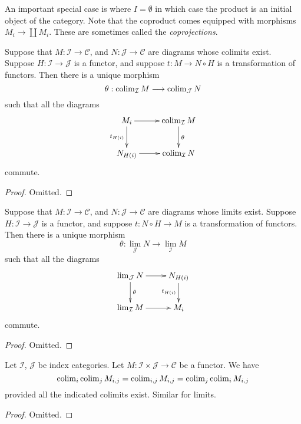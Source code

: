 \noindent
An important special case is where $I = \emptyset$ in which case the
product is an initial object of the category.
Note that the coproduct comes equipped with morphisms
$M_i \to \coprod M_i$. These are sometimes called the
{\it coprojections}.

\begin{lemma}
\label{lemma-functorial-colimit}
Suppose that $M : \mathcal{I} \to \mathcal{C}$,
and $N : \mathcal{J} \to \mathcal{C}$ are diagrams
whose colimits exist. Suppose
$H : \mathcal{I} \to \mathcal{J}$ is
a functor, and suppose $t : M \to N \circ H$
is a transformation of functors.
Then there is a unique morphism
$$
\theta :
\mathop{\rm colim}\nolimits_{\mathcal{I}} M
\longrightarrow
\mathop{\rm colim}\nolimits_{\mathcal{J}} N
$$
such that all the diagrams
$$
\xymatrix{
M_i \ar[d]_{t_{H(i)}} \ar[r]
&
\colim_{\mathcal{I}} M \ar[d]^{\theta}
\\
N_{H(i)} \ar[r]
&
\colim_{\mathcal{I}} N
}
$$
commute.
\end{lemma}

\begin{proof}
Omitted.
\end{proof}

\begin{lemma}
\label{lemma-functorial-limit}
Suppose that $M : \mathcal{I} \to \mathcal{C}$,
and $N : \mathcal{J} \to \mathcal{C}$ are diagrams
whose limits exist. Suppose $H : \mathcal{I} \to \mathcal{J}$ is
a functor, and suppose $t : N \circ H \to M$
is a transformation of functors.
Then there is a unique morphism
$$
\theta :
\lim_{\mathcal{J}} N
\longrightarrow
\lim_{\mathcal{I}} M
$$
such that all the diagrams
$$
\xymatrix{
\lim_{\mathcal{J}} N \ar[d]^{\theta} \ar[r]
&
N_{H(i)} \ar[d]_{t_{H(i)}}
\\
\lim_{\mathcal{I}} M \ar[r]
&
M_i
}
$$
commute.
\end{lemma}

\begin{proof}
Omitted.
\end{proof}


\begin{lemma}
\label{lemma-colimits-commute}
Let $\mathcal{I}$, $\mathcal{J}$ be index categories.
Let $M : \mathcal{I} \times \mathcal{J} \to \mathcal{C}$ be a functor.
We have
$$
\mathop{\rm colim}\nolimits_i \mathop{\rm colim}\nolimits_j M_{i, j}
=
\mathop{\rm colim}\nolimits_{i, j} M_{i, j}
=
\mathop{\rm colim}\nolimits_j \mathop{\rm colim}\nolimits_i M_{i, j}
$$
provided all the indicated colimits exist. Similar for limits.
\end{lemma}

\begin{proof}
Omitted.
\end{proof}

